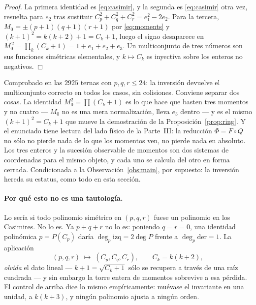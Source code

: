 \documentclass[11pt,a4paper]{article}
\begin{document}
\begin{proof}
La primera identidad es \eqref{eq:casimir}, y la segunda es \eqref{eq:casimir} otra vez, resuelta
para $e_2$ tras sustituir $C_p^2+C_q^2+C_r^2=e_1^2-2e_2$. Para la tercera,
$M_0=\pm(p{+}1)(q{+}1)(r{+}1)$ por \eqref{eq:moments} y $(k+1)^2=k(k+2)+1=C_k+1$, luego el signo
desaparece en $M_0^{\,2}=\prod_k(C_k+1)=1+e_1+e_2+e_3$. Un multiconjunto de tres n\'umeros son sus
funciones sim\'etricas elementales, y $k\mapsto C_k$ es inyectiva sobre los enteros no negativos.
\end{proof}

\noindent Comprobado en las $2925$ ternas con $p,q,r\le24$: la inversi\'on devuelve el
multiconjunto correcto en todos los casos, sin colisiones. Conviene separar dos cosas. La
identidad $M_0^2=\prod(C_k+1)$ es lo que hace que basten tres momentos y no cuatro --- $M_0$ no es
una mera normalizaci\'on, lleva $e_3$ dentro --- y es el mismo $(k+1)^2=C_k+1$ que mueve la
demostraci\'on de la Proposici\'on~\ref{prop:ring}. Y el enunciado tiene lectura del lado
f\'isico de la Parte~III: la reducci\'on $\Phi=F\circ Q$ no s\'olo no pierde nada de lo que los
momentos ven, no pierde nada en absoluto. Los tres enteros y la sucesi\'on observable de momentos
son dos sistemas de coordenadas para el mismo objeto, y cada uno se calcula del otro en forma
cerrada. Condicionada a la Observaci\'on~\ref{obs:main}, por supuesto: la inversi\'on hereda su
estatus, como todo en esta secci\'on.

\paragraph{Por qu\'e esto no es una tautolog\'ia.} Lo ser\'ia si todo polinomio sim\'etrico en
$(p,q,r)$ fuese un polinomio en los Casimires. No lo es. Ya $p+q+r$ no lo es: poniendo $q=r=0$,
una identidad polin\'omica $p=P(C_p)$ dar\'ia $\deg_p\text{izq}=2\deg P$ frente a
$\deg_p\text{der}=1$. La aplicaci\'on
\[
(p,q,r)\;\longmapsto\;(C_p,C_q,C_r),\qquad C_k=k(k+2),
\]
\emph{olvida} el dato lineal --- $k+1=\sqrt{C_k+1}$ s\'olo se recupera a trav\'es de una ra\'iz
cuadrada --- y sin embargo la torre entera de momentos sobrevive a esa p\'erdida. El control de
arriba dice lo mismo emp\'iricamente: mu\'evase el invariante en una unidad, a $k(k+3)$, y
ning\'un polinomio ajusta a ning\'un orden.
\end{document}
